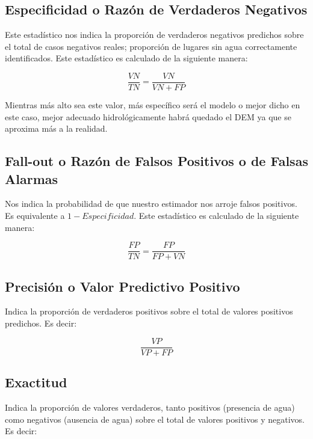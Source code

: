 \documentclass[10pt,a4paper, twoside]{report}
\begin{document}
\subsection{Especificidad o Razón de Verdaderos Negativos}

Este estadístico nos indica la proporción de verdaderos negativos predichos sobre el total de casos negativos reales; proporción de lugares sin agua correctamente identificados. Este estadístico es calculado de la siguiente manera: 

\begin{equation}
\frac{VN}{TN}=\frac{VN}{VN + FP}
\end{equation}

Mientras más alto sea este valor, más específico será el modelo o mejor dicho en este caso, mejor adecuado hidrológicamente habrá quedado el DEM ya que se aproxima más a la realidad.

\subsection{Fall-out o Razón de Falsos Positivos o de Falsas Alarmas}

Nos indica la probabilidad de que nuestro estimador nos arroje falsos positivos. Es equivalente a $1 - Especificidad$. Este estadístico es calculado de la siguiente manera:

\begin{equation}
\frac{FP}{TN}=\frac{FP}{FP+VN}
\end{equation}

\subsection{Precisión o Valor Predictivo Positivo}

Indica la proporción de verdaderos positivos sobre el total de valores positivos predichos. Es decir:

\begin{equation}
\frac{VP}{VP+FP}
\end{equation}

\subsection{Exactitud}

Indica la proporción de valores verdaderos, tanto positivos (presencia de agua) como negativos (ausencia de agua) sobre el total de valores positivos y negativos. Es decir:
\end{document}
